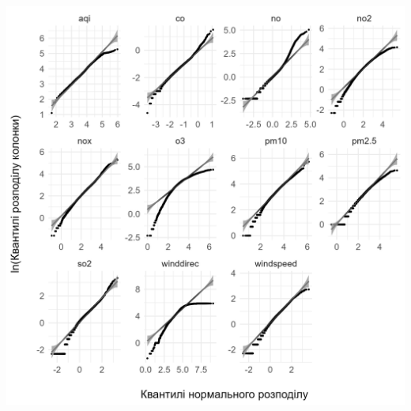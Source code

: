 \documentclass[./report.tex]{subfiles}
\begin{document}
\begin{enumerate}
    \includegraphics[width=6in]{plots/qq_tidy/qq-log.png}
    
\end{enumerate}
\end{document}
